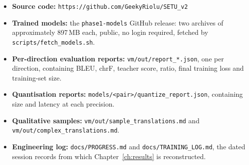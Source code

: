 \begin{itemize}
  \item \textbf{Source code:} \texttt{https://github.com/GeekyRiolu/SETU\_v2}
\enlargethispage{\baselineskip}
  \item \textbf{Trained models:} the \texttt{phase1-models} GitHub release:
        two archives of approximately 897\,MB each, public, no login required,
        fetched by \texttt{scripts/fetch\_models.sh}.
  \item \textbf{Per-direction evaluation reports:} \texttt{vm/out/report\_*.json},
        one per direction, containing BLEU, chrF, teacher score, ratio, final
        training loss and training-set size.
  \item \textbf{Quantisation reports:} \texttt{models/<pair>/quantize\_report.json},
        containing size and latency at each precision.
  \item \textbf{Qualitative samples:} \texttt{vm/out/sample\_translations.md} and
        \texttt{vm/out/complex\_translations.md}.
  \item \textbf{Engineering log:} \texttt{docs/PROGRESS.md} and
        \texttt{docs/TRAINING\_LOG.md}, the dated session records from which
        Chapter~\ref{ch:results} is reconstructed.
\end{itemize}

\clearpage
